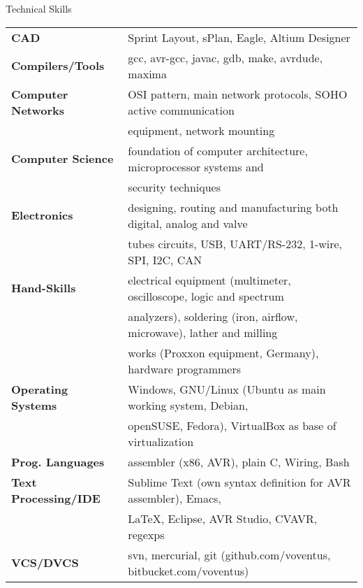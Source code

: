 \documentclass{resume}
\begin{document}

\begin{rSection}{Technical Skills}

\begin{tabular}{ @{} >{\bfseries}l @{\hspace{6ex}} l }
CAD                 & Sprint Layout, sPlan, Eagle, Altium Designer \\
Compilers/Tools     & gcc, avr-gcc, javac, gdb, make, avrdude, maxima \\
Computer Networks   & OSI pattern, main network protocols, SOHO active communication \\
                    & equipment, network mounting \\
Computer Science    & foundation of computer architecture, microprocessor systems and \\
                    & security techniques \\
Electronics         & designing, routing and manufacturing both digital, analog and valve \\
                    & tubes circuits, USB, UART/RS-232, 1-wire, SPI, I2C, CAN \\
Hand-Skills         & electrical equipment (multimeter, oscilloscope, logic and spectrum \\
                    & analyzers), soldering (iron, airflow, microwave), lather and milling \\
                    & works (Proxxon equipment, Germany), hardware programmers \\
Operating Systems   & Windows, GNU/Linux (Ubuntu as main working system, Debian, \\
                    & openSUSE, Fedora), VirtualBox as base of virtualization \\
Prog. Languages     & assembler (x86, AVR), plain C, Wiring, Bash \\
Text Processing/IDE & Sublime Text (own syntax definition for AVR assembler), Emacs, \\
                    & LaTeX, Eclipse, AVR Studio, CVAVR, regexps \\
VCS/DVCS            & svn, mercurial, git (github.com/voventus, bitbucket.com/voventus)
\end{tabular}

\end{rSection}
\end{document}

